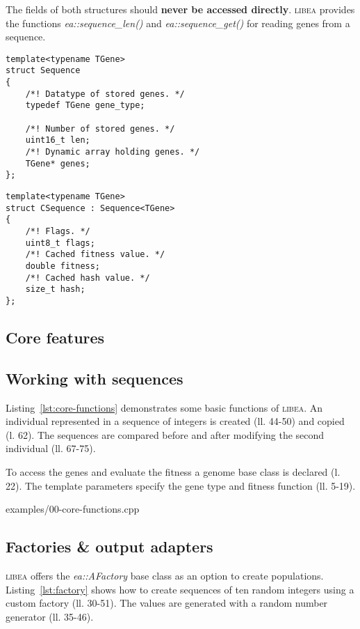 \documentclass[a4paper]{article}
\begin{document}
The fields of both structures should \textbf{never be accessed directly}. \textsc{libea} provides the functions \textit{ea::sequence\_len()} and \textit{ea::sequence\_get()} for reading genes from a sequence.

\begin{lstlisting}[caption=Sequence template declaration, label=lst:sequence]
template<typename TGene>
struct Sequence
{
	/*! Datatype of stored genes. */
	typedef TGene gene_type;

	/*! Number of stored genes. */
	uint16_t len;
	/*! Dynamic array holding genes. */
	TGene* genes;
};
\end{lstlisting}

\begin{lstlisting}[caption=CSequence template declaration, label=lst:csequence]
template<typename TGene>
struct CSequence : Sequence<TGene>
{
	/*! Flags. */
	uint8_t flags;
	/*! Cached fitness value. */
	double fitness;
	/*! Cached hash value. */
	size_t hash;
};
\end{lstlisting}

\subsection{Core features}

\subsection{Working with sequences}

Listing~\ref{lst:core-functions} demonstrates some basic functions of \textsc{libea}. An individual represented in a sequence of integers is created (ll. 44-50) and copied (l. 62). The sequences are compared before and after modifying the second individual (ll. 67-75).

To access the genes and evaluate the fitness a genome base class is declared (l. 22). The template parameters specify the gene type and fitness function (ll. 5-19).

\begin{lstinputlisting}[caption=core functions,label=lst:core-functions]{examples/00-core-functions.cpp}
\end{lstinputlisting}

\subsection{Factories \& output adapters}

\textsc{libea} offers the \textit{ea::AFactory} base class as an option to create populations. Listing~\ref{lst:factory} shows how to create sequences of ten random integers using a custom factory (ll. 30-51). The values are generated with a random number generator (ll. 35-46).
\end{document}
